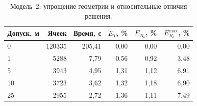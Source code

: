 \begin{table}[htbp]
\centering\small
\caption{Модель~2: упрощение геометрии и относительные отличия решения.}\label{tab:rdp}
\begin{tabular}{lrrrrr}
\toprule
Допуск, м & Ячеек & Время, с & $E_T$, \% & $E_{R_o}$, \% & $E_{R_o}^{\max}$, \% \\
\midrule
0 & 120335 & 205,41 & 0,00 & 0,00 & 0,00 \\
1 & 5288 & 7,79 & 0,56 & 0,92 & 3,48 \\
5 & 3943 & 4,95 & 1,31 & 1,12 & 6,91 \\
10 & 3723 & 3,62 & 1,32 & 1,18 & 6,90 \\
25 & 2955 & 2,72 & 1,36 & 1,11 & 7,49 \\
\bottomrule
\end{tabular}
\end{table}
